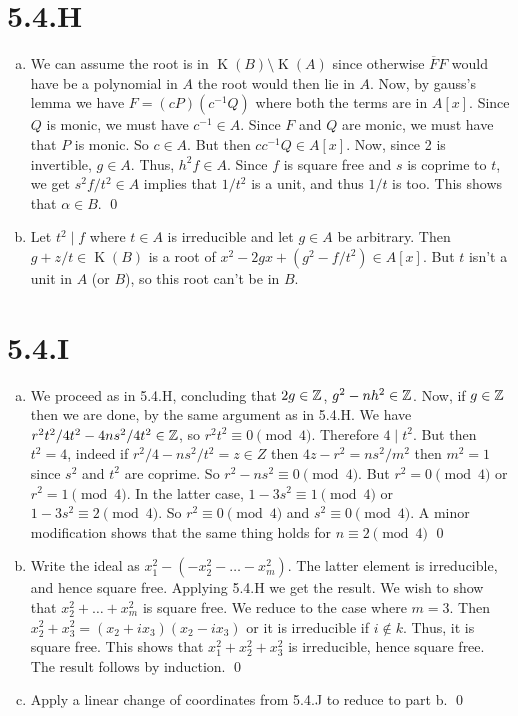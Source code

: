 \documentclass{article}
\begin{document}
\section{5.4.H}
\begin{enumerate}[a.]
    \item We can assume the root is in $\operatorname{K}(B) \setminus \operatorname{K}(A)$ since otherwise $\overline{F}F$ would have be a polynomial in $A$ the root would then lie in $A$. Now, by gauss's lemma we have $F=(cP)(c^{-1}Q)$ where both the terms are in $A[x]$. Since $Q$ is monic, we must have $c^{-1} \in A$. Since $F$ and $Q$ are monic, we must have that $P$ is monic. So $c \in A$. But then $cc^{-1}Q \in A[x]$. Now, since 2 is invertible, $g\in A$. Thus, $h^2f \in A$. Since $f$ is square free and $s$ is coprime to $t$, we get $s^2f/t^2 \in A$ implies that $1/t^2$ is a unit, and thus $1/t$ is too. This shows that $\alpha \in B$. \qed
    \item Let $t^2 \mid f$ where $t \in A$ is irreducible and let $g \in A$ be arbitrary. Then $g+z/t \in \operatorname{K}(B)$ is a root of $x^2-2gx+(g^2-f/t^2) \in A[x]$. But $t$ isn't a unit in $A$ (or $B$), so this root can't be in $B$.
\end{enumerate}

\section{5.4.I}
\begin{enumerate}[a.]
    \item We proceed as in 5.4.H, concluding that $2g \in \mathbb{Z}$, $g^2-nh^2 \in \mathbb{Z}$. Now, if $g \in \mathbb{Z}$ then we are done, by the same argument as in 5.4.H. We have $r^2t^2/4t^2-4ns^2/4t^2 \in \mathbb{Z}$, so $r^2t^2 \equiv 0 \pmod{4}$. Therefore $4 \mid t^2$. But then $t^2 = 4$, indeed if $r^2/4-ns^2/t^2=z \in Z$ then $4z-r^2=ns^2/m^2$ then $m^2=1$ since $s^2$ and $t^2$ are coprime. So $r^2-ns^2 \equiv 0 \pmod{4}$. But $r^2 = 0 \pmod{4}$ or $r^2 = 1 \pmod{4}$. In the latter case, $1-3s^2 \equiv 1 \pmod{4}$ or $1-3s^2 \equiv 2 \pmod{4}$. So $r^2 \equiv 0 \pmod{4}$ and $s^2 \equiv 0 \pmod{4}$. A minor modification shows that the same thing holds for $n \equiv 2 \pmod{4}$ \qed
    \item Write the ideal as $x_1^2-(-x_2^2-\dots-x_m^2)$. The latter element is irreducible, and hence square free. Applying 5.4.H we get the result.
          We wish to show that $x_2^2+\dots+x_m^2$ is square free. We reduce to the case where $m=3$. Then $x_2^2+x_3^2=(x_2+ix_3)(x_2-ix_3)$ or it is irreducible if $i \notin k$. Thus, it is square free. This shows that $x_1^2+x_2^2+x_3^2$ is irreducible, hence square free. The result follows by induction. \qed
    \item Apply a linear change of coordinates from 5.4.J to reduce to part b. \qed
\end{enumerate}
\end{document}
